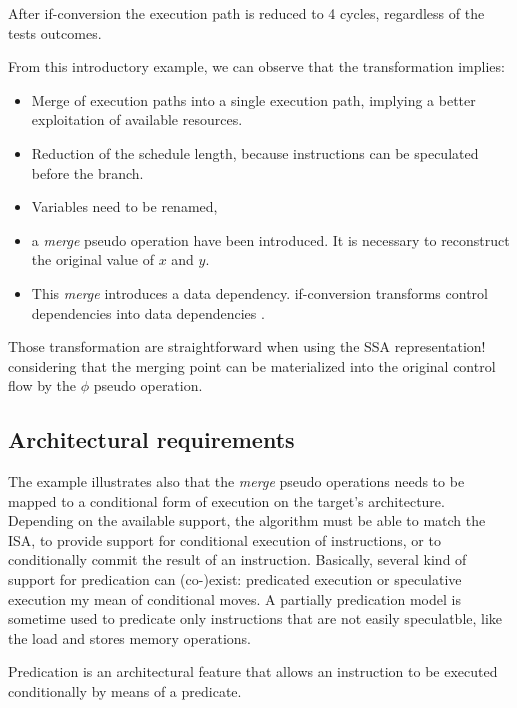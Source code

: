 After if-conversion the execution path is reduced to 4 cycles, regardless of the tests outcomes. 

From this introductory example, we can observe that the transformation implies:

\begin{itemize}
\item Merge of execution paths into a single execution path, implying a  better exploitation of available resources.  
\item Reduction of the schedule length, because instructions can be speculated before the branch.
\item Variables need to be renamed, 
\item a \textit{merge} pseudo operation have been introduced. It is necessary to reconstruct the original value of $x$ and $y$.
\item This \textit{merge} introduces a data dependency. if-conversion transforms control dependencies into data dependencies \cite{Allen:1983:CCD:567067.567085}. 
\end{itemize}

Those transformation are straightforward when using the SSA representation! considering that the merging point can be materialized into the original control flow by the $\phi$ pseudo operation.

\subsection{Architectural requirements}
The example illustrates also that the \textit{merge} pseudo operations needs to be mapped to a conditional form of execution on the target's architecture. Depending on the available support, the algorithm must be able to match the ISA, to provide support for conditional execution of instructions, or to conditionally commit the result of an instruction.
Basically, several kind of support for predication can (co-)exist: predicated execution  or speculative execution my mean of conditional moves. A partially predication model is sometime used to predicate only instructions that are not easily speculatble, like the load and stores memory operations.

Predication is an architectural feature that allows an instruction to be executed conditionally by means of a predicate.

